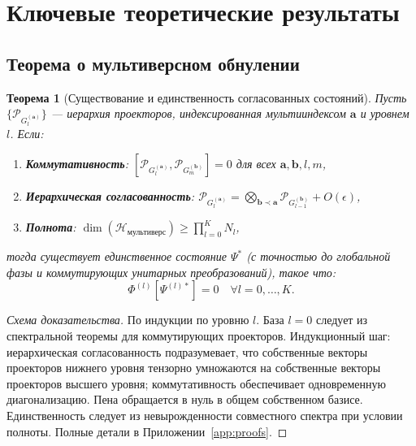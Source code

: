 \documentclass[11pt,a4paper]{article}
\theoremstyle{plain}
\newtheorem{theorem}{Теорема}[section]
\theoremstyle{definition}
\theoremstyle{remark}
\newcommand{\Hilbert}{\mathcal{H}}
\newcommand{\Foam}{\Phi}
\newcommand{\Projector}{\mathcal{P}}
\begin{document}
\section{Ключевые теоретические результаты}
\label{sec:theorems}

\subsection{Теорема о мультиверсном обнулении}

\begin{theorem}[Существование и единственность согласованных состояний]
\label{thm:nullification}
Пусть $\{\Projector_{G_l^{(\mathbf{a})}}\}$ --- иерархия проекторов, индексированная мультииндексом $\mathbf{a}$ и уровнем $l$. Если:
\begin{enumerate}[label=(\roman*)]
    \item \textbf{Коммутативность}: $[\Projector_{G_l^{(\mathbf{a})}}, \Projector_{G_m^{(\mathbf{b})}}] = 0$ для всех $\mathbf{a},\mathbf{b},l,m$,
    \item \textbf{Иерархическая согласованность}: $\Projector_{G_l^{(\mathbf{a})}} = \bigotimes_{\mathbf{b} \prec \mathbf{a}} \Projector_{G_{l-1}^{(\mathbf{b})}} + O(\epsilon)$,
    \item \textbf{Полнота}: $\dim(\Hilbert_{\text{мультиверс}}) \geq \prod_{l=0}^K N_l$,
\end{enumerate}
тогда существует единственное состояние $\Psi^*$ (с точностью до глобальной фазы и коммутирующих унитарных преобразований), такое что:
\begin{equation}
\Foam^{(l)}[\Psi^{(l)*}] = 0 \quad \forall l = 0,\dots,K.
\label{eq:full_nullification}
\end{equation}
\end{theorem}

\begin{proof}[Схема доказательства]
По индукции по уровню $l$. База $l=0$ следует из спектральной теоремы для коммутирующих проекторов. Индукционный шаг: иерархическая согласованность подразумевает, что собственные векторы проекторов нижнего уровня тензорно умножаются на собственные векторы проекторов высшего уровня; коммутативность обеспечивает одновременную диагонализацию. Пена обращается в нуль в общем собственном базисе. Единственность следует из невырожденности совместного спектра при условии полноты. Полные детали в Приложении~\ref{app:proofs}.
\end{proof}
\end{document}
